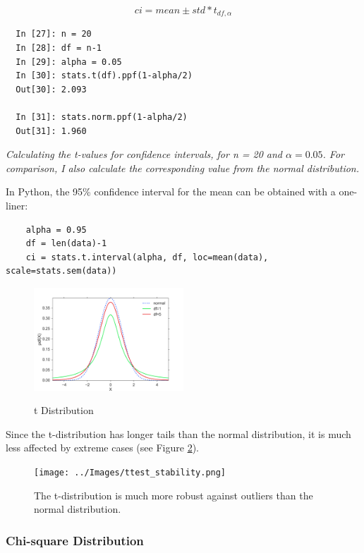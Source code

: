 \begin{equation}
  ci = mean \pm std * t_{df,\alpha}
\end{equation}\label{eq:ci_t}

\begin{lstlisting}
  In [27]: n = 20
  In [28]: df = n-1
  In [29]: alpha = 0.05
  In [30]: stats.t(df).ppf(1-alpha/2)
  Out[30]: 2.093

  In [31]: stats.norm.ppf(1-alpha/2)
  Out[31]: 1.960
\end{lstlisting}

\emph{Calculating the t-values for confidence intervals, for n = 20 and $\alpha=0.05$. For comparison, I also calculate the corresponding value from the normal distribution.}

In Python, the 95\% confidence interval for the mean can be obtained with a one-liner:

\begin{lstlisting}
    alpha = 0.95
    df = len(data)-1
    ci = stats.t.interval(alpha, df, loc=mean(data), scale=stats.sem(data))
\end{lstlisting}

\begin{figure}
  \centering
  \includegraphics[width=0.5\textwidth]{../Images/dist_t.png}\\
  \caption{t Distribution}\label{fig:t}
\end{figure}

Since the t-distribution has longer tails than the normal distribution, it is much less affected by extreme cases (see Figure \ref{fig:ttest_stability}).

\begin{figure}
  \centering
  \texttt{[image: ../Images/ttest\_stability.png]}\\
  \caption{The t-distribution is much more robust against outliers than the normal distribution.}\label{fig:ttest_stability}
\end{figure}


\subsubsection{Chi-square Distribution}


